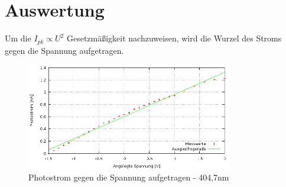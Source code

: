 \section{Auswertung}



Um die $I_{pk} \propto U^2$
Gesetzmäßigkeit nachzuweisen, wird die Wurzel des Stroms gegen die Spannung aufgetragen.

\begin{figure}[H]
\includegraphics[width=0.8\textwidth]{pics/wurzel404.jpg}
\caption{Photostrom gegen die Spannung aufgetragen - 404,7nm}
\end{figure}

